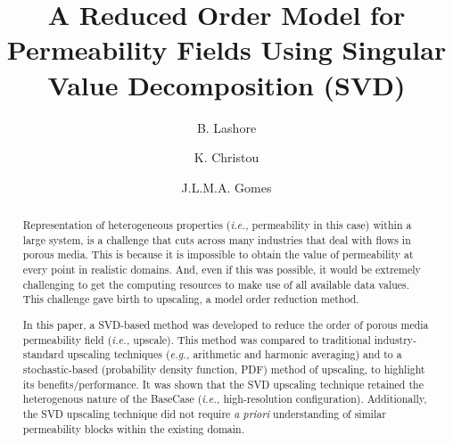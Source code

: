 \documentclass[preprint,12pt]{elsarticle}
\newcommand{\eg}{{\it e.g., }}
\newcommand{\ie}{{\it i.e., }}
\begin{document}
\begin{frontmatter}



\title{A Reduced Order Model for Permeability Fields Using Singular Value Decomposition (SVD)}
\author[UoA]{B. Lashore} \author[UoA]{K. Christou} \author[UoA]{J.L.M.A. Gomes}
\address[UoA]{Mechanics of Fluids, Soils \& Structures Research Group \\ School of Engineering, University of Aberdeen, UK}


\begin{abstract}

Representation of heterogeneous properties (\ie permeability in this case) within a large system, is a challenge that cuts across many industries that deal with flows in porous media. This is because it is impossible to obtain the value of permeability at every point in realistic domains. And, even if this was possible, it would be extremely challenging to get the computing resources to make use of all available data values. This challenge gave birth to upscaling, a model order reduction method.

In this paper, a SVD-based method was developed to reduce the order of porous media permeability field (\ie upscale). This method was compared to traditional industry-standard upscaling techniques (\eg arithmetic and harmonic averaging) and to a stochastic-based (probability density function, PDF) method of upscaling, to highlight its benefits/performance. It was shown that the SVD upscaling technique retained the heterogenous nature of the BaseCase (\ie high-resolution configuration). Additionally, the SVD upscaling technique did not require {\it a priori} understanding of similar permeability blocks within the existing domain.


\end{abstract}
\end{frontmatter}
\end{document}
